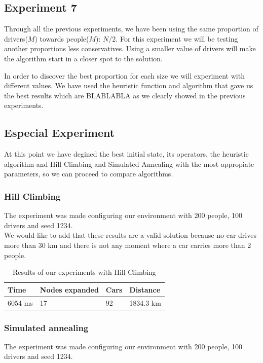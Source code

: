 \documentclass[12]{article}
\begin{document}
\subsection{Experiment 7}
Through all the previous experiments, we have been using the same proportion of drivers($M$) towards people($M$): $N/2$. For this experiment we will be testing another proportions less conservatives. Using a smaller value of drivers will make the algorithm start in a closer spot to the solution.

In order to discover the best proportion for each size we will experiment with different values. We have used the heuristic function and algorithm that gave us the best results which are BLABLABLA as we clearly showed in the previous experiments. 



\subsection{Especial Experiment}

At this point we have degined the best initial state, its operators, the heuristic algorithm and Hill Climbing and Simulated Annealing with the most appropiate parameters, so we can proceed to compare algorithms. 


\subsubsection{Hill Climbing}

The experiment was made configuring our environment with 200 people, 100 drivers and seed 1234.
\\

We would like to add that these results are a valid solution because no car drives more than 30 km and there is not any moment where a car carries more than 2 people. 
\\

\begin{table}[h]
\centering
\begin{tabular}{|l|l|l|l|}
\hline \textbf{Time} &
 \textbf{Nodes expanded} & \textbf{Cars} & \textbf{Distance}\\  \hline
6054 ms &  17 & 92 & 1834.3 km \\ \hline
\end{tabular}
\caption{Results of our experiments with Hill Climbing}
\label{Results}
\end{table}

\subsubsection{Simulated annealing}
The experiment was made configuring our environment with 200 people, 100 drivers and seed 1234.
\\
\end{document}

